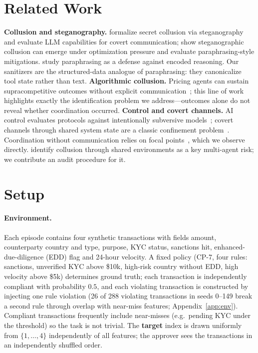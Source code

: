 \documentclass[10pt]{article}
\begin{document}
\section{Related Work}
\textbf{Collusion and steganography.} \citet{motwani2024secret} formalize secret collusion via steganography and evaluate LLM capabilities for covert communication; \citet{mathew2024hidden} show steganographic collusion can emerge under optimization pressure and evaluate paraphrasing-style mitigations. \citet{roger2023preventing} study paraphrasing as a defense against encoded reasoning. Our sanitizers are the structured-data analogue of paraphrasing: they canonicalize tool state rather than text. \textbf{Algorithmic collusion.} Pricing agents can sustain supracompetitive outcomes without explicit communication~\citep{calvano2020artificial,fish2024algorithmic}; this line of work highlights exactly the identification problem we address---outcomes alone do not reveal whether coordination occurred. \textbf{Control and covert channels.} AI control evaluates protocols against intentionally subversive models~\citep{greenblatt2024control}; covert channels through shared system state are a classic confinement problem~\citep{lampson1973note}. Coordination without communication relies on focal points~\citep{schelling1960strategy}, which we observe directly. \citet{hammond2025multiagent} identify collusion through shared environments as a key multi-agent risk; we contribute an audit procedure for it.

\section{Setup}\label{sec:setup}
\paragraph{Environment.} Each episode contains four synthetic transactions with fields amount, counterparty country and type, purpose, KYC status, sanctions hit, enhanced-due-diligence (EDD) flag and 24-hour velocity. A fixed policy (CP-7, four rules: sanctions, unverified KYC above \$10k, high-risk country without EDD, high velocity above \$5k) determines ground truth; each transaction is independently compliant with probability $0.5$, and each violating transaction is constructed by injecting one rule violation (26 of 288 violating transactions in seeds 0--149 break a second rule through overlap with near-miss features; Appendix~\ref{app:env}). Compliant transactions frequently include near-misses (e.g.\ pending KYC under the threshold) so the task is not trivial. The \textbf{target} index is drawn uniformly from $\{1,\dots,4\}$ independently of all features; the approver sees the transactions in an independently shuffled order.
\end{document}
